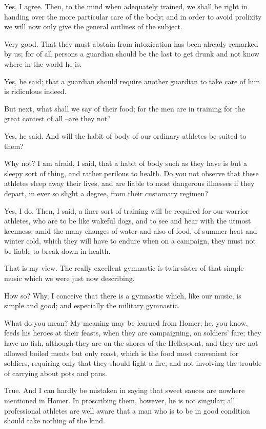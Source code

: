Yes, I agree.
Then, to the mind when adequately trained, we shall be right in handing over the more particular care of the body; and in order to avoid prolixity we will now only give the general outlines of the subject.

Very good.
That they must abstain from intoxication has been already remarked by us; for of all persons a guardian should be the last to get drunk and not know where in the world he is.

Yes, he said; that a guardian should require another guardian to take care of him is ridiculous indeed.

But next, what shall we say of their food; for the men are in training for the great contest of all --are they not?

Yes, he said.
And will the habit of body of our ordinary athletes be suited to them?

Why not?
I am afraid, I said, that a habit of body such as they have is but a sleepy sort of thing, and rather perilous to health. Do you not observe that these athletes sleep away their lives, and are liable to most dangerous illnesses if they depart, in ever so slight a degree, from their customary regimen?

Yes, I do.
Then, I said, a finer sort of training will be required for our warrior athletes, who are to be like wakeful dogs, and to see and hear with the utmost keenness; amid the many changes of water and also of food, of summer heat and winter cold, which they will have to endure when on a campaign, they must not be liable to break down in health.

That is my view.
The really excellent gymnastic is twin sister of that simple music which we were just now describing.

How so?
Why, I conceive that there is a gymnastic which, like our music, is simple and good; and especially the military gymnastic.

What do you mean?
My meaning may be learned from Homer; he, you know, feeds his heroes at their feasts, when they are campaigning, on soldiers' fare; they have no fish, although they are on the shores of the Hellespont, and they are not allowed boiled meats but only roast, which is the food most convenient for soldiers, requiring only that they should light a fire, and not involving the trouble of carrying about pots and pans.

True.
And I can hardly be mistaken in saying that sweet sauces are nowhere mentioned in Homer. In proscribing them, however, he is not singular; all professional athletes are well aware that a man who is to be in good condition should take nothing of the kind.

